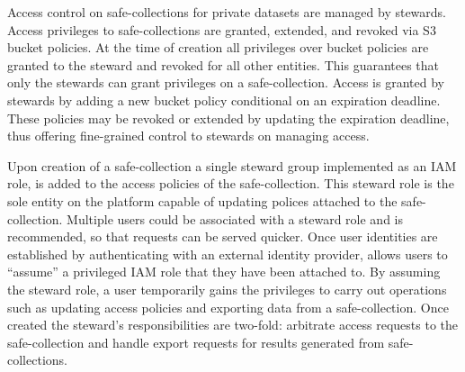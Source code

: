 Access control on safe-collections for private datasets are managed by stewards. Access privileges to
safe-collections are granted, extended, and revoked via S3 bucket policies. At the time of creation all
privileges over bucket policies are granted to the steward and revoked for all other entities. This
guarantees that only the stewards can grant privileges on a safe-collection. Access is granted by stewards
by adding a new bucket policy conditional on an expiration deadline. These policies may be revoked or
extended by updating the expiration deadline, thus offering fine-grained control to stewards on managing
access.



Upon creation of a safe-collection a single steward group implemented as an IAM role, is added to the
access policies of the safe-collection. This steward role is the sole entity on the platform capable of
updating polices attached to the safe-collection.
Multiple users could be associated with a steward role and is recommended, so that requests can be served quicker.
Once user identities are established by authenticating with an external identity provider,
\NAME allows users to ``assume'' a privileged IAM role that they have been attached to.
By assuming the steward role, a user temporarily gains the privileges to carry out operations such
as updating access policies and exporting data from a safe-collection.
Once created the steward's responsibilities are two-fold: arbitrate access requests to the safe-collection and
handle export requests for results generated from safe-collections.





